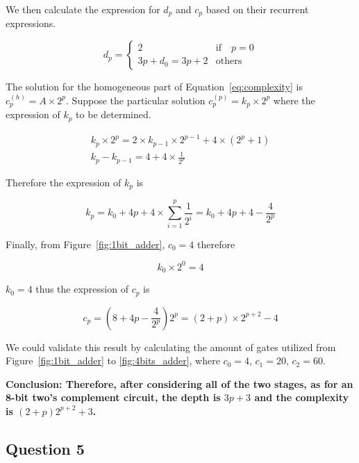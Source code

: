 \documentclass[conference]{IEEEtran}
\begin{document}
We then calculate the expression for $d_p$ and $c_p$ based on their recurrent expressions.

\begin{equation}
    d_p = \begin{cases}
        2 \quad &\text{if} \quad p = 0 \\
        3p + d_0 = 3p + 2 &\text{others}
    \end{cases}
\end{equation}

The solution for the homogeneous part of Equation~\ref{eq:complexity} is $c_p^{(h)} = A \times 2^p$. Suppose the particular solution $c_p^{(p)} = k_p\times 2^p$ where the expression of $k_p$ to be determined.

\begin{gather*}
    k_p \times 2^p = 2 \times k_{p-1} \times 2^{p-1} + 4 \times (2^p+1) \\
    k_p - k_{p-1} =4 + 4 \times \frac{1}{2^p}
\end{gather*}

Therefore the expression of $k_p$ is 

\begin{equation}
    k_p = k_0 +  4p + 4 \times \sum_{i=1}^{p} \frac{1}{2^i} = k_0 + 4p+4- \frac{4}{2^p}
\end{equation}

Finally, from Figure~\ref{fig:1bit_adder}, $c_0 = 4$ therefore

\begin{equation}
    k_0 \times 2^0 = 4
\end{equation}

$k_0 = 4$ thus the expression of $c_p$ is 

\begin{equation}
    c_p = (8 + 4p - \frac{4}{2^p}) 2^p = (2+ p) \times 2^{p+2} - 4
\end{equation}

We could validate this result by calculating the amount of gates utilized from Figure~\ref{fig:1bit_adder} to \ref{fig:4bits_adder}, where $c_0 = 4$, $c_1=20$, $c_2=60$.


\textbf{Conclusion: Therefore, after considering all of the two stages, as for an 8-bit two's complement circuit, the depth is $3p+3$ and the complexity is $(2+p)2^{p+2} + 3$.}

\subsection{Question 5}
\end{document}
